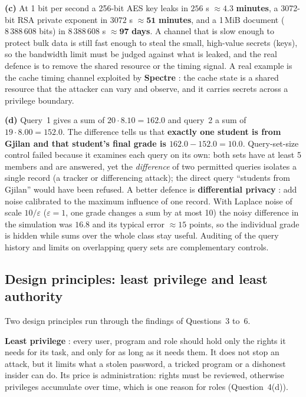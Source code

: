 \documentclass[11pt,a4paper]{article}
\begin{document}
\textbf{(c)} At 1 bit per second a 256-bit AES key leaks in $256$ s $\approx \mathbf{4.3}$ \textbf{minutes}, a
3072-bit RSA private exponent in $3072$ s $\approx \mathbf{51}$ \textbf{minutes}, and a 1\,MiB document
($8\,388\,608$ bits) in $8\,388\,608$ s $\approx \mathbf{97}$ \textbf{days}. A channel that is slow enough to
protect bulk data is still fast enough to steal the small, high-value secrets (keys), so the bandwidth limit
must be judged against what is leaked, and the real defence is to remove the shared resource or the timing signal.
A real example is the cache timing channel exploited by \textbf{Spectre} \cite{spectre}: the cache
state is a shared resource that the attacker can vary and observe, and it carries secrets across a
privilege boundary.

\textbf{(d)} Query~1 gives a sum of $20\cdot 8.10=162.0$ and query~2 a sum of $19\cdot 8.00=152.0$. The
difference tells us that \textbf{exactly one student is from Gjilan and that student's final grade is
$162.0-152.0=\mathbf{10.0}$}. Query-set-size control failed because it examines each query on its own:
both sets have at least 5 members and are answered, yet the \emph{difference} of two permitted queries isolates a
single record (a tracker or differencing attack); the direct query ``students from Gjilan'' would have been
refused. A better defence is \textbf{differential privacy} \cite{dwork}: add noise calibrated to the maximum
influence of one record. With Laplace noise of scale $10/\varepsilon$ ($\varepsilon=1$, one grade changes a sum by at most
10) the noisy difference in the simulation was $16.8$ and its typical error $\approx 15$ points, so the
individual grade is hidden while sums over the whole class stay useful. Auditing of the query history and limits
on overlapping query sets are complementary controls.

\needspace{12cm}
\subsection*{Design principles: least privilege and least authority}
Two design principles run through the findings of Questions~3 to~6.

\textbf{Least privilege} \cite{saltzer,nist80053}: every user, program and role should hold only the rights it needs
for its task, and only for as long as it needs them. It does not stop an attack, but it limits what a stolen
password, a tricked program or a dishonest insider can do. Its price is administration: rights must be reviewed,
otherwise privileges accumulate over time, which is one reason for roles (Question~4(d)).
\end{document}
